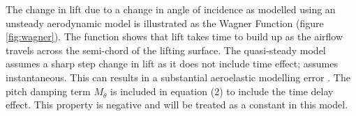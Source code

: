 \documentclass[11pt]{article}
\begin{document}
The change in lift due to a change in angle of incidence as modelled using an unsteady aerodynamic model is illustrated as the Wagner Function (figure \ref{fig:wagner}). The function shows that lift takes time to build up as the  airflow travels across the semi-chord of the lifting surface. The quasi-steady model assumes a sharp step change in lift as it does not include time effect; assumes instantaneous. This can results in a substantial aeroelastic modelling error \cite{Wright2015INTRODUCTIONLOADS}. The pitch damping term $M_{\dot{\theta}}$ is included in equation (2) to include the time delay effect. This property is negative and will be treated as a constant in this model.\\ \\

\end{document}
